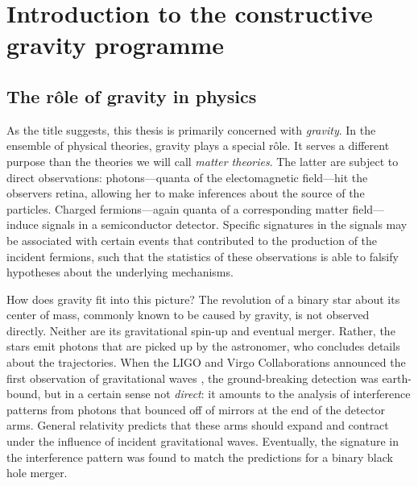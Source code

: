 \chapter{Introduction to the constructive gravity programme}

\section{The r\^ole of gravity in physics}
As the title suggests, this thesis is primarily concerned with \emph{gravity}. In the ensemble of physical theories, gravity plays a special r\^ole. It serves a different purpose than the theories we will call \emph{matter theories}. The latter are subject to direct observations: photons---quanta of the electomagnetic field---hit the observers retina, allowing her to make inferences about the source of the particles. Charged fermions---again quanta of a corresponding matter field---induce signals in a semiconductor detector. Specific signatures in the signals may be associated with certain events that contributed to the production of the incident fermions, such that the statistics of these observations is able to falsify hypotheses about the underlying mechanisms.

How does gravity fit into this picture? The revolution of a binary star about its center of mass, commonly known to be caused by gravity, is not observed directly. Neither are its gravitational spin-up and eventual merger. Rather, the stars emit photons that are picked up by the astronomer, who concludes details about the trajectories. When the LIGO and Virgo Collaborations announced the first observation of gravitational waves \cite{ligo}, the ground-breaking detection was earth-bound, but in a certain sense not \emph{direct}: it amounts to the analysis of interference patterns from photons that bounced off of mirrors at the end of the detector arms. General relativity predicts that these arms should expand and contract under the influence of incident gravitational waves. Eventually, the signature in the interference pattern was found to match the predictions for a binary black hole merger.

